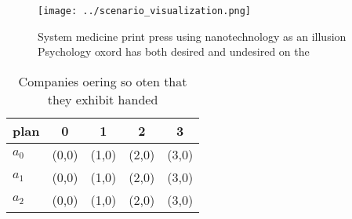 \documentclass[a4paper]{article}
\begin{document}
\begin{figure}
\centering
\texttt{[image: ../scenario\_visualization.png]}
\caption{System medicine print press using nanotechnology as an illusion Psychology oxord has both desired and undesired on the 
}
\end{figure}
 
\begin{table}
\begin{adjustbox}{width=0.5\columnwidth}
\begin{tabular}{|l|l|l|l|l|}
\hline
\textbf{plan} & \multicolumn{1}{c|}{\textbf{0}} & \multicolumn{1}{c|}{\textbf{1}} & \multicolumn{1}{c|}{\textbf{2}} & \multicolumn{1}{c|}{\textbf{3}} \\ \hline
\textbf{$a_0$}  & (0,0) & (1,0) & (2,0) & (3,0) \\ \hline
\textbf{$a_1$}  & (0,0) & (1,0) & (2,0) & (3,0) \\ \hline
\textbf{$a_2$}  & (0,0) & (1,0) & (2,0) & (3,0) \\ \hline
\end{tabular}
\end{adjustbox}
\caption{Companies oering so oten that they exhibit handed
}
\end{table}
\end{document}
